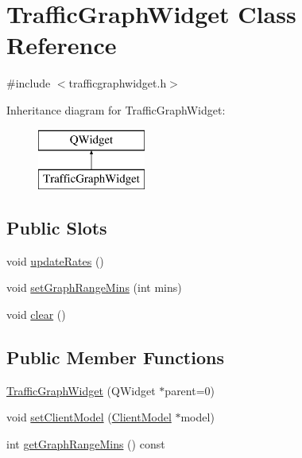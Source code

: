 \hypertarget{class_traffic_graph_widget}{}\section{Traffic\+Graph\+Widget Class Reference}
\label{class_traffic_graph_widget}


{\ttfamily \#include $<$trafficgraphwidget.\+h$>$}

Inheritance diagram for Traffic\+Graph\+Widget\+:\begin{figure}[H]
\begin{center}
\leavevmode
\includegraphics[height=2.000000cm]{class_traffic_graph_widget}
\end{center}
\end{figure}
\subsection*{Public Slots}
\begin{DoxyCompactItemize}
\item 
void \hyperlink{class_traffic_graph_widget_a5a1ae0d0a8cc43c67386de4aa1111340}{update\+Rates} ()
\item 
void \hyperlink{class_traffic_graph_widget_aa08cb5ae735e58a79bdff42b933ec4c4}{set\+Graph\+Range\+Mins} (int mins)
\item 
void \hyperlink{class_traffic_graph_widget_a71c23db2649ab8781fa9a294e540b7ee}{clear} ()
\end{DoxyCompactItemize}
\subsection*{Public Member Functions}
\begin{DoxyCompactItemize}
\item 
\hyperlink{class_traffic_graph_widget_a99f4f3f14bab99bef8918cb4f5f69aa6}{Traffic\+Graph\+Widget} (Q\+Widget $\ast$parent=0)
\item 
void \hyperlink{class_traffic_graph_widget_a8f627aaf6171695d94a0e83b239fe1ac}{set\+Client\+Model} (\hyperlink{class_client_model}{Client\+Model} $\ast$model)
\item 
int \hyperlink{class_traffic_graph_widget_a5ce07b8f9c222d49bcc65703fbaf9be6}{get\+Graph\+Range\+Mins} () const 
\end{DoxyCompactItemize}
